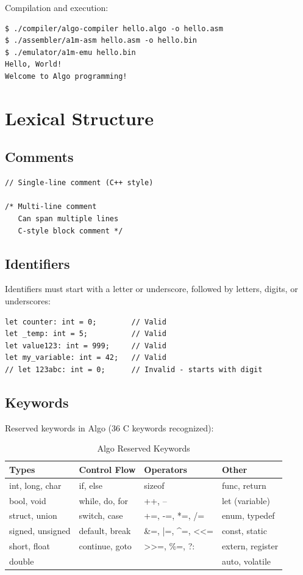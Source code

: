 \documentclass[12pt,a4paper,oneside]{book}
\begin{document}
Compilation and execution:
\begin{lstlisting}[style=bash]
$ ./compiler/algo-compiler hello.algo -o hello.asm
$ ./assembler/a1m-asm hello.asm -o hello.bin
$ ./emulator/a1m-emu hello.bin
Hello, World!
Welcome to Algo programming!
\end{lstlisting}

\section{Lexical Structure}

\subsection{Comments}

\begin{lstlisting}[style=algo]
// Single-line comment (C++ style)

/* Multi-line comment
   Can span multiple lines
   C-style block comment */
\end{lstlisting}

\subsection{Identifiers}

Identifiers must start with a letter or underscore, followed by letters, digits, or underscores:

\begin{lstlisting}[style=algo]
let counter: int = 0;        // Valid
let _temp: int = 5;          // Valid
let value123: int = 999;     // Valid
let my_variable: int = 42;   // Valid
// let 123abc: int = 0;      // Invalid - starts with digit
\end{lstlisting}

\subsection{Keywords}

Reserved keywords in Algo (36 C keywords recognized):

\begin{table}[H]
\centering
\caption{Algo Reserved Keywords}
\small
\begin{tabularx}{\textwidth}{|X|X|X|X|}
\hline
\textbf{Types} & \textbf{Control Flow} & \textbf{Operators} & \textbf{Other} \\
\hline
int, long, char & if, else & sizeof & func, return \\
bool, void & while, do, for & ++, -- & let (variable) \\
struct, union & switch, case & +=, -=, *=, /= & enum, typedef \\
signed, unsigned & default, break & \&=, |=, \^{}=, <<= & const, static \\
short, float & continue, goto & >>=, \%=, ?: & extern, register \\
double & & & auto, volatile \\
\hline
\end{tabularx}
\end{table}
\end{document}
